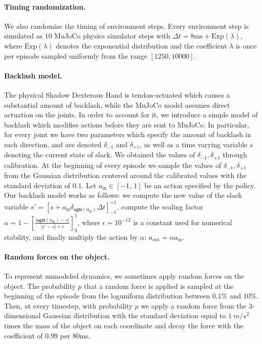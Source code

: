 \paragraph{Timing randomization.}
We also randomize the timing of environment steps.
Every environment step is simulated as $10$ MuJoCo physics simulator steps
with $\Delta t=8\mbox{ms}+\mbox{Exp}(\lambda)$, where 
$\mbox{Exp}(\lambda)$ denotes the exponential distribution
and the coefficient $\lambda$ is once per episode sampled uniformly from the
range $[1250,10000]$.

\paragraph{Backlash model.}
The physical Shadow Dexterous Hand is tendon-actuated which causes a substantial
amount of backlash, while the MuJoCo model assumes direct actuation on the joints.
In order to account for it, we introduce a simple model of backlash which modifies
actions before they are sent to MuJoCo.
In particular, for every joint we have two parameters which
specify the amount of backlash in each direction, and are denoted $\delta_{-1}$ and $\delta_{+1}$,
as well as a time varying variable $s$ denoting the current state of slack.
We obtained the values of $\delta_{-1}, \delta_{+1}$ through
calibration.
At the beginning of every episode we sample the values of $\delta_{-1}, \delta_{+1}$
from the Gaussian distribution centered around the calibrated values with the standard deviation of $0.1$.
Let $a_{\text{in}} \in [-1,\,1]$ be an action specified by the policy.
Our backlash model works as follows: we compute the new value of the slack variable
$s'=[s+a_{\text{in}} \delta_{\textbf{sgn}(a_\text{in})} \Delta t]_{-1}^{+1}$,
compute the scaling factor
$\alpha=1-\left[\frac{|\textbf{sgn}(a_\text{in})-s|}{|s'-s|+\epsilon}\right]_0^1$,
where $\epsilon=10^{-12}$ is a constant used for numerical stability,
and finally multiply the action by $\alpha$:
$a_{\text{out}} = \alpha a_{\text{in}}$.
    
\paragraph{Random forces on the object.}
To represent unmodeled dynamics, we sometimes apply random forces on the object.
The probability $p$ that a random force is applied is sampled at the beginning of the episode from the loguniform distribution between $0.1\%$ and $10\%$.
Then, at every timestep, with probability $p$ we apply a random force
from the $3$-dimensional Gaussian distribution with the standard deviation equal to $1~m/s^2$ times the mass of the object on each coordinate and decay the force with the coefficient of $0.99$ per $80$ms.


